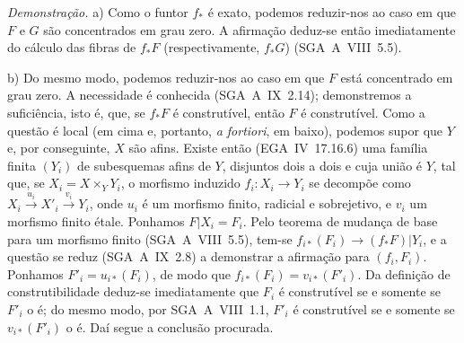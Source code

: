 \emph{Demonstração.} a) Como o funtor $f_{*}$ é exato, podemos reduzir-nos ao caso em que $F$ e $G$ são concentrados em grau zero. A afirmação deduz-se então imediatamente do cálculo das fibras de $f_{*}F$ (respectivamente, $f_{*}G$) (SGA~A~VIII~5.5).

b) Do mesmo modo, podemos reduzir-nos ao caso em que $F$ está concentrado em grau zero. A necessidade é conhecida (SGA~A~IX~2.14); demonstremos a suficiência, isto é, que, se $f_{*}F$ é construtível, então $F$ é construtível. Como a questão é local (em cima e, portanto, \emph{a fortiori}, em baixo), podemos supor que $Y$ e, por conseguinte, $X$ são afins. Existe então (EGA~IV~17.16.6) uma família finita $(Y_i)$ de subesquemas afins de $Y$, disjuntos dois a dois e cuja união é $Y$, tal que, se $X_i = X \times_Y Y_i$, o morfismo induzido $f_i : X_i \to Y_i$ se decompõe como $X_i \xrightarrow{u_i} X'_i \xrightarrow{v_i} Y_i$, onde $u_i$ é um morfismo finito, radicial e sobrejetivo, e $v_i$ um morfismo finito étale. Ponhamos $F|X_i = F_i$. Pelo teorema de mudança de base para um morfismo finito (SGA~A~VIII~5.5), tem-se $f_{i*}(F_i) \to (f_{*}F)|Y_i$, e a questão se reduz (SGA~A~IX~2.8) a demonstrar a afirmação para $(f_i, F_i)$. Ponhamos $F'_i = u_{i*}(F_i)$, de modo que $f_{i*}(F_i) = v_{i*}(F'_i)$. Da definição de construtibilidade deduz-se imediatamente que $F_i$ é construtível se e somente se $F'_i$ o é; do mesmo modo, por SGA~A~VIII~1.1, $F'_i$ é construtível se e somente se $v_{i*}(F'_i)$ o é. Daí segue a conclusão procurada.
